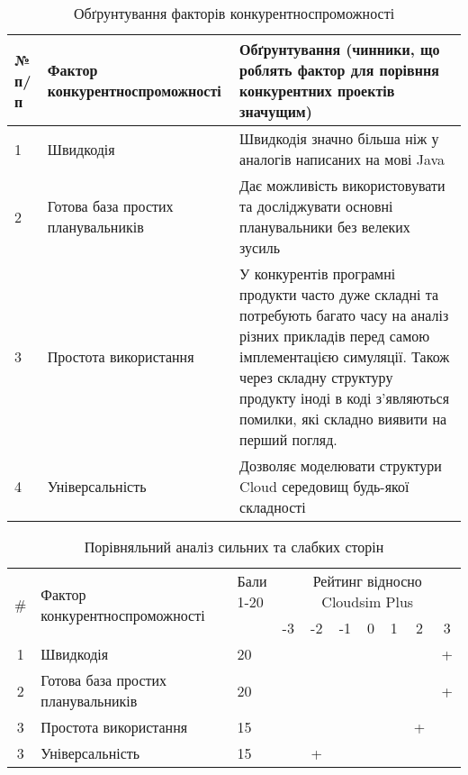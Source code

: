 \begin{table}[H]
	\begin{tabular}
		{|l|p{7cm}|p{7cm}|} \hline
		№ п/п
		& Фактор конкурентноспроможності
		& Обґрунтування (чинники, що роблять фактор для порівння конкурентних проектів значущим)
		\\ \hline
		
		1
		& Швидкодія
		& Швидкодія значно більша ніж у аналогів написаних на мові Java
		\\ \hline
		
		2
		& Готова база простих планувальників
		& Дає можливість використовувати та досліджувати основні планувальники без велеких зусиль
		\\ \hline
		
		3
		& Простота використання
		& У конкурентів програмні продукти часто дуже складні та потребують багато часу на аналіз різних прикладів перед самою імплементацією симуляції. Також через складну структуру продукту іноді в коді з'являються помилки, які складно виявити на перший погляд.
		\\ \hline
		
		4
		& Універсальність
		& Дозволяє моделювати структури Cloud середовищ будь-якої складності
		
		\\ \hline
	\end{tabular}
	\caption{Обґрунтування факторів конкурентноспроможності}
\end{table}


\begin{table}[H]
	\centering
	\begin{tabular}{|c|p{8cm}|p{1cm}|c|c|c|c|c|c|c|}
		\hline
		\multirow{2}{*}{\#} & \multirow{2}{*}{Фактор конкурентноспроможності}                 & \multirowcell{2}{Бали\\ 1-20} & \multicolumn{7}{c|}{Рейтинг відносно Cloudsim Plus} \\ \cline{4-10}
		
							&                                              					  &                            &  -3 & -2  & -1  & 0 & 1 & 2 & 3 \\ \hline
		1                   & Швидкодія								            			  & 20                         &     &     &     &   &   &   & + \\ \hline
		2                   & Готова база простих планувальників                              & 20                         &     &     &     &   &   &   & + \\ \hline
		3                   & Простота використання           								  & 15                         &     &     &     &   &   & + &   \\ \hline
		3                   & Універсальність										          & 15                         &     &  +  &     &   &   &   &   \\ \hline
	\end{tabular}
	\caption{Порівняльний аналіз сильних та слабких сторін}
\end{table}

